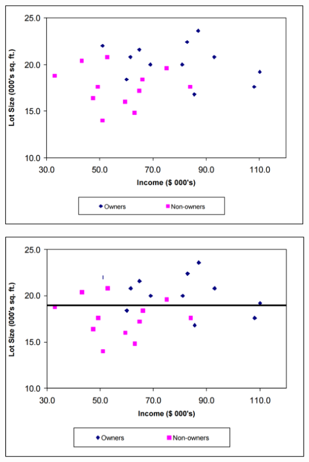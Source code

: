 \documentclass[xcolor=table,aspectratio=169]{beamer}
\begin{document}
\begin{frame}
	\includegraphics[height=\textheight]{pics/tree1.png}
\end{frame}
\begin{frame}
	\includegraphics[height=\textheight]{pics/tree2.png}
\end{frame}
\end{document}
